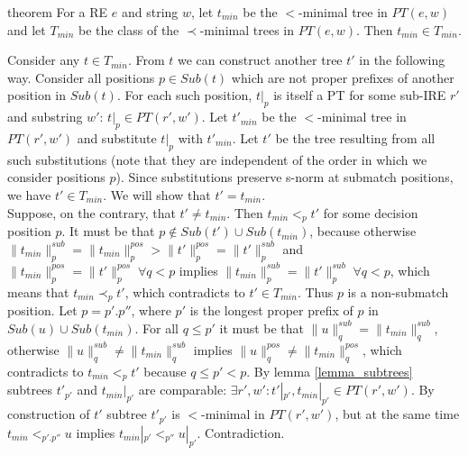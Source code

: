 \documentclass[AMA,STIX1COL]{WileyNJD-v2}
\newcommand{\PT}{PT}
\newcommand{\pnorm}[2]{\|{#1}\|^{pos}_{#2}}
\newcommand{\snorm}[2]{\|{#1}\|^{sub}_{#2}}
\begin{document}
\begin{theoremEnd}[restate, no link to proof, no link to theorem, category=theorem_order_compat]{theorem}
    \label{theorem_order_compat}
    For a RE $e$ and string $w$,
    let $t_{min}$ be the $<$-minimal tree in $\PT(e,w)$
    and let $T_{min}$ be the class of the $\prec$-minimal trees in $\PT(e,w)$.
    Then $t_{min} \in T_{min}$.
\end{theoremEnd}
\begin{proofEnd}
    Consider any $t \in T_{min}$.
    From $t$ we can construct another tree $t'$ in the following way.
    Consider all positions $p \in Sub(t)$ which are not proper prefixes of another position in $Sub(t)$.
    For each such position, $t|_p$ is itself a PT for some sub-IRE $r'$ and substring $w'$: $t|_p \in \PT(r', w')$.
    Let $t'_{min}$ be the $<$-minimal tree in $\PT(r', w')$ and substitute $t|_p$ with $t'_{min}$.
    Let $t'$ be the tree resulting from all such substitutions
    (note that they are independent of the order in which we consider positions $p$).
    Since substitutions preserve s-norm at submatch positions, we have $t' \in T_{min}$.
    We will show that $t' = t_{min}$.
    \\[0.5em]
    Suppose, on the contrary, that $t' \neq t_{min}$.
    Then $t_{min} <_p t'$ for some decision position $p$.
    It must be that $p \not\in Sub(t') \cup Sub(t_{min})$, because
    otherwise $\snorm{t_{min}}{p} = \pnorm{t_{min}}{p} > \pnorm{t'}{p} = \snorm{t'}{p}$
    and $\pnorm{t_{min}}{p} = \pnorm{t'}{p} \; \forall q < p$ implies $\snorm{t_{min}}{p} = \snorm{t'}{p} \; \forall q < p$,
    which means that $t_{min} \prec_p t'$, which contradicts to $t' \in T_{min}$.
    Thus $p$ is a non-submatch position.
    Let $p = p'.p''$, where $p'$ is the longest proper prefix of $p$ in $Sub(u) \cup Sub(t_{min})$.
    For all $q \leq p'$ it must be that $\snorm{u}{q} = \snorm{t_{min}}{q}$,
    otherwise $\snorm{u}{q} \neq \snorm{t_{min}}{q}$ implies $\pnorm{u}{q} \neq \pnorm{t_{min}}{q}$,
    which contradicts to $t_{min} <_p t'$ because $q \leq p' < p$.
    By lemma \ref{lemma_subtrees} subtrees $t'_{p'}$ and $t_{min}|_{p'}$ are comparable:
    $\exists r', w' : t'|_{p'}, t_{min}|_{p'} \in \PT(r', w')$.
    By construction of $t'$ subtree $t'_{p'}$ is $<$-minimal in $\PT(r', w')$,
    but at the same time $t_{min} <_{p'.p''} u$ implies $t_{min}|_{p'} <_{p''} u|_{p'}$.
    Contradiction.
\end{proofEnd}
\end{document}
